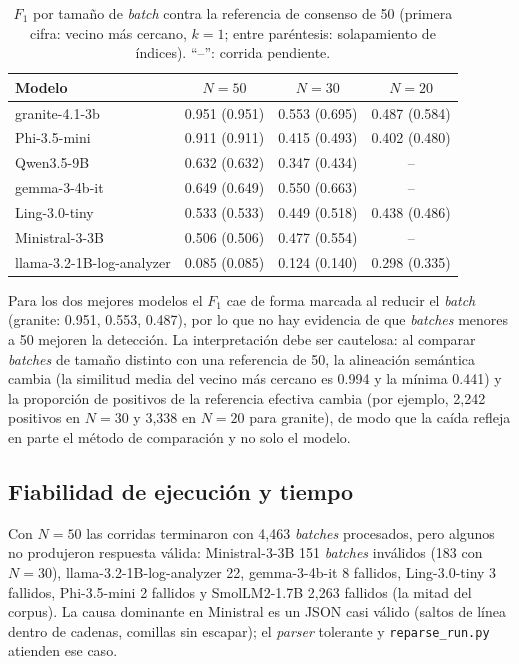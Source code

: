 \begin{table}[H]
\centering
\caption{$F_1$ por tamaño de \textit{batch} contra la referencia de consenso de 50 (primera cifra: vecino más cercano, $k=1$; entre paréntesis: solapamiento de índices). ``--'': corrida pendiente.}
\label{tab:res_tamano}
\small
\begin{tabular}{@{}lccc@{}}
\toprule
\textbf{Modelo} & \textbf{$N=50$} & \textbf{$N=30$} & \textbf{$N=20$} \\
\midrule
granite-4.1-3b & 0.951 (0.951) & 0.553 (0.695) & 0.487 (0.584) \\
Phi-3.5-mini & 0.911 (0.911) & 0.415 (0.493) & 0.402 (0.480) \\
Qwen3.5-9B & 0.632 (0.632) & 0.347 (0.434) & -- \\
gemma-3-4b-it & 0.649 (0.649) & 0.550 (0.663) & -- \\
Ling-3.0-tiny & 0.533 (0.533) & 0.449 (0.518) & 0.438 (0.486) \\
Ministral-3-3B & 0.506 (0.506) & 0.477 (0.554) & -- \\
llama-3.2-1B-log-analyzer & 0.085 (0.085) & 0.124 (0.140) & 0.298 (0.335) \\
\bottomrule
\end{tabular}
\normalsize
\end{table}

Para los dos mejores modelos el $F_1$ cae de forma marcada al reducir el \textit{batch} (granite: 0.951, 0.553, 0.487), por lo que no hay evidencia de que \textit{batches} menores a 50 mejoren la detección. La interpretación debe ser cautelosa: al comparar \textit{batches} de tamaño distinto con una referencia de 50, la alineación semántica cambia (la similitud media del vecino más cercano es 0.994 y la mínima 0.441) y la proporción de positivos de la referencia efectiva cambia (por ejemplo, 2{,}242 positivos en $N=30$ y 3{,}338 en $N=20$ para granite), de modo que la caída refleja en parte el método de comparación y no solo el modelo. %

\subsection{Fiabilidad de ejecución y tiempo}\label{subsec:res_fiabilidad}

Con $N=50$ las corridas terminaron con 4{,}463 \textit{batches} procesados, pero algunos no produjeron respuesta válida: Ministral-3-3B 151 \textit{batches} inválidos (183 con $N=30$), llama-3.2-1B-log-analyzer 22, gemma-3-4b-it 8 fallidos, Ling-3.0-tiny 3 fallidos, Phi-3.5-mini 2 fallidos y SmolLM2-1.7B 2{,}263 fallidos (la mitad del corpus). La causa dominante en Ministral es un JSON casi válido (saltos de línea dentro de cadenas, comillas sin escapar); el \textit{parser} tolerante y \texttt{reparse\_run.py} atienden ese caso. %

